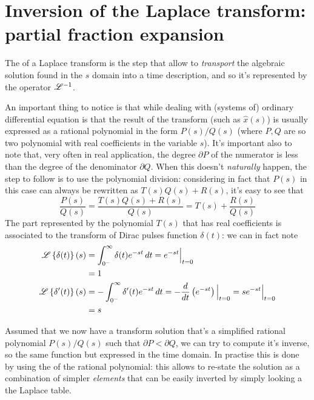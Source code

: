 	
\section{Inversion of the Laplace transform: partial fraction expansion}
	
	The  of a Laplace transform is the step that allow to \textit{transport} the algebraic solution found in the $s$ domain into a time description, and so it's represented by the operator $\mathscr{L}^{-1}$.
	
	An important thing to notice is that while dealing with (systems of) ordinary differential equation is that the result of the transform (such as $\hat x(s)$) is usually expressed as a rational polynomial in the form $P(s)/Q(s)$ (where $P,Q$ are so two polynomial with real coefficients in the variable $s$). It's important also to note that, very often in real application, the degree $\partial P$ of the numerator is less than the degree of the denominator $\partial Q$. When this doesn't \textit{naturally} happen, the step to follow is to use the polynomial division: considering in fact that $P(s)$ in this case can always be rewritten as $T(s)Q(s) + R(s)$, it's easy to see that
	\[ \frac{P(s)}{Q(s)} = \frac{T(s)Q(s) + R(s)}{Q(s)} = T(s) + \frac{R(s)}{Q(s)} \]
	The part represented by the polynomial $T(s)$ that has real coefficients is associated to the transform of Dirac pulses function $\delta(t)$: we can in fact note
	\begin{equation}
		\begin{split}
			\mathscr{L} \left\{ \delta(t) \right\}(s) & = \int_{0^-}^\infty \delta(t) e^{-st}\, dt = e^{-st} \Big|_{t=0} \\ & = 1 \\
			\mathscr{L} \left\{ \delta'(t) \right\}(s) & = -\int_{0^-}^\infty \delta'(t) e^{-st} \, dt = - \frac d {dt} \left(e^{-st}\right) \Big|_{t=0} = s e^ {-st} \Big|_{t=0} \\ & = s
		\end{split}
	\end{equation} \vspace{0.5cm}

	Assumed that we now have a transform solution that's a simplified rational polynomial $P(s)/Q(s)$ such that $\partial P < \partial Q$, we can try to compute it's inverse, so the same function but expressed in the time domain. In practise this is done by using the  of the rational polynomial: this allows to re-state the solution as a combination of simpler \textit{elements} that can be easily inverted by simply looking a the Laplace table.
	
